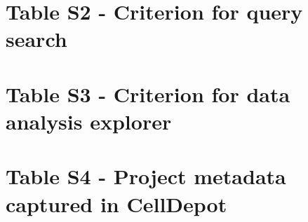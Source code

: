 \documentclass[
]{book}
\begin{document}
\hypertarget{table-s2---criterion-for-query-search}{%
\section*{Table S2 - Criterion for query search}\label{table-s2---criterion-for-query-search}}

\begin{table}
\caption{Table S2: Criterion for query search}
\centering
{}
\end{table}

\hypertarget{table-s3---criterion-for-data-analysis-explorer}{%
\section*{Table S3 - Criterion for data analysis explorer}\label{table-s3---criterion-for-data-analysis-explorer}}

\begin{table}
\caption{Table S3: Criterion for data analysis explorer}
\centering
{}
\end{table}

\hypertarget{table-s4---project-metadata-captured-in-celldepot}{%
\section*{Table S4 - Project metadata captured in CellDepot}\label{table-s4---project-metadata-captured-in-celldepot}}
\end{document}

